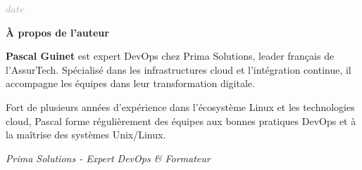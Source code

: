 \documentclass[12pt,a4paper]{article}
\begin{document}
\vspace{\fill}

\begin{center}
    \textcolor{darkgray}{\large $date$}
\end{center}

\newpage


\vspace{2cm}

\begin{center}
\begin{tcolorbox}[colback=white, colframe=primaryblue, width=13cm, arc=5mm]
    \textbf{\Large À propos de l'auteur}
    
    \vspace{0.5cm}
    
    \textbf{Pascal Guinet} est expert DevOps chez Prima Solutions, leader français de l'AssurTech. Spécialisé dans les infrastructures cloud et l'intégration continue, il accompagne les équipes dans leur transformation digitale.
    
    \vspace{0.3cm}
    
    Fort de plusieurs années d'expérience dans l'écosystème Linux et les technologies cloud, Pascal forme régulièrement des équipes aux bonnes pratiques DevOps et à la maîtrise des systèmes Unix/Linux.
    
    \vspace{0.3cm}
    
    \textit{Prima Solutions - Expert DevOps \& Formateur}
\end{tcolorbox}
\end{center}

\vspace{2cm}
\end{document}
